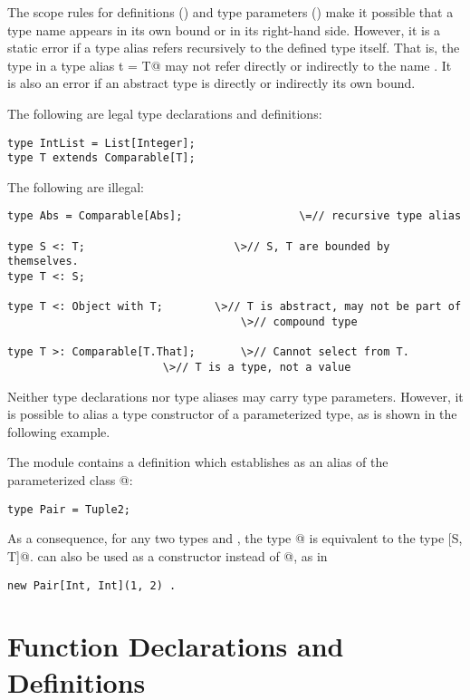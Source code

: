 \documentclass[11pt]{report}
\begin{document}
The scope rules for definitions () and type parameters
() make it possible that a type name appears in its
own bound or in its right-hand side.  However, it is a static error if
a type alias refers recursively to the defined type itself.  That is,
the type \verb@T@ in a type alias \verb@type t = T@ may not refer
directly or indirectly to the name \verb@t@.  It is also an error if
an abstract type is directly or indirectly its own bound.

\example The following are legal type declarations and definitions:
\begin{verbatim}
type IntList = List[Integer];
type T extends Comparable[T];
\end{verbatim}

The following are illegal:
\begin{verbatim}
type Abs = Comparable[Abs];	                 \=// recursive type alias

type S <: T;                       \>// S, T are bounded by themselves.
type T <: S;

type T <: Object with T;	    \>// T is abstract, may not be part of
                                    \>// compound type

type T >: Comparable[T.That];       \>// Cannot select from T.
			            \>// T is a type, not a value
\end{verbatim}

Neither type declarations nor type aliases may carry type
parameters. However, it is possible to alias a type constructor of a
parameterized type, as is shown in the following example.

\example The \verb@Predef@ module contains a definition which establishes \verb@Pair@ 
as an alias of the parameterized class @:
\begin{verbatim}
type Pair = Tuple2;
\end{verbatim}
As a consequence, for any two types \verb@S@ and \verb@T@, the type
\verb@Pair[S, T]@ is equivalent to the type [S, T]@.
\verb@Pair@ can also be used as a constructor instead of @, as in
\begin{verbatim}
new Pair[Int, Int](1, 2) .
\end{verbatim}

\section{Function Declarations and Definitions}
\label{sec:defdef}
\label{sec:funsigs}
\end{document}
